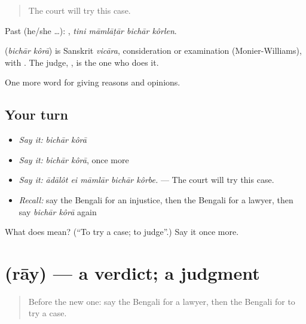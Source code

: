 \begin{quote}
The court will try this case.
\end{quote}

Past (he/she …):    , \emph{tini māmlāṭār bichār kôrlen}.

\begin{cousinweb}
\textbf{ } (\emph{bichār kôrā}) is Sanskrit \emph{vicāra}, consideration or examination (Monier-Williams), with . The judge, , is the one who does it.
\end{cousinweb}

\begin{grammarlens}[title={What you've built}]
One more word for giving reasons and opinions.
\end{grammarlens}

\subsection*{Your turn}
\begin{itemize}
\raggedright
  \item \emph{Say it:} \emph{bichār kôrā}
  \item \emph{Say it:} \emph{bichār kôrā}, once more
  \item \emph{Say it:} \emph{ādālôt ei māmlār bichār kôrbe.} — The court will try this case.
  \item \emph{Recall:} say the Bengali for an injustice, then the Bengali for a lawyer, then say \emph{bichār kôrā} again
\end{itemize}

\begin{tcolorbox}[breakable,colback=teal!4,colframe=teal!35!black,title={Before you move on}]
What does   mean? (\textquotedblleft{}To try a case; to judge\textquotedblright{}.) Say it once more.
\end{tcolorbox}
\section[\texorpdfstring{\bn{রায়} (rāy)}{রায় (rāy)}]{ (rāy) — a verdict; a judgment}

\label{lesson:BN-C342-ray}



\begin{quote}
Before the new one: say the Bengali for a lawyer, then the Bengali for to try a case.
\end{quote}

